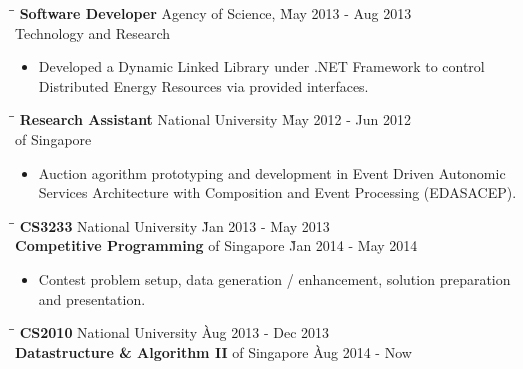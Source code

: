 \documentclass[9pt]{article}
\begin{document}
\begin{tabbing}
\hspace{2.6in} \= \hspace{2.6in}\= \kill
{\bf Software Developer} \> Agency of Science,  \`May 2013 - Aug 2013\\
             \> Technology and Research
\end{tabbing}

\begin{itemize}
  \item Developed a Dynamic Linked Library under .NET Framework to control Distributed Energy Resources via provided interfaces.
\end{itemize}

\begin{tabbing}
\hspace{2.6in}\= \hspace{2.6in}\= \kill
{\bf Research Assistant} \> National University \`May 2012 - Jun 2012\\
             \> of Singapore
\end{tabbing}

\begin{itemize}
    \item Auction agorithm prototyping and development in Event Driven Autonomic Services Architecture with Composition and Event Processing (EDASACEP).
\end{itemize}

\medskip


\begin{tabbing}
\hspace{2.6in}\= \hspace{2.6in}\= \kill
{\bf CS3233} \> National University \`Jan 2013 - May 2013\\
{\bf  Competitive Programming}  \> of Singapore \`Jan 2014 - May 2014
\end{tabbing}

\begin{itemize}
  \item Contest problem setup, data generation / enhancement, solution preparation and presentation. \vspace{-6pt}
\end{itemize}

\begin{tabbing}
\hspace{2.6in}\= \hspace{2.6in}\= \kill
{\bf CS2010} \> National University \`Aug 2013 - Dec 2013\\
{\bf Datastructure \& Algorithm II}  \> of Singapore \`Aug 2014 - Now
\end{tabbing}
\end{document}
